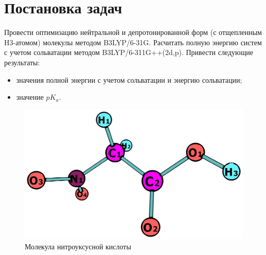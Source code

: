\section{Постановка задач}
Провести оптимизацию нейтральной и депротонированной форм (с отщепленным H3-атомом) молекулы методом B3LYP/6-31G. Расчитать полную энергию систем с учетом сольватации методом B3LYP/6-311G++(2d,p). Привести следующие результаты: 
\begin{itemize}
    \item значения полной энергии с учетом сольватации и энергию сольватации;
    \item значение $pK_a$.
\end{itemize}

\begin{figure}[H]
\centering
\captionsetup{justification=centering}
\includegraphics[scale=0.4]{fig/0.jpg}
\caption{Молекула нитроуксусной кислоты}
\end{figure}
